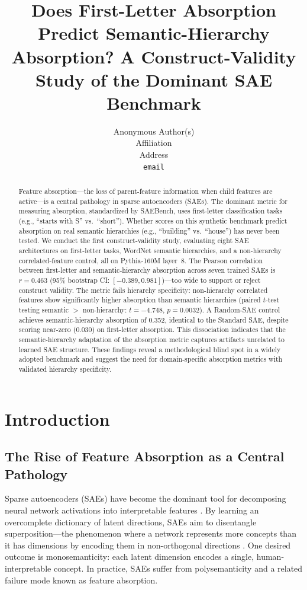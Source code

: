 \documentclass{article}
\title{Does First-Letter Absorption Predict Semantic-Hierarchy Absorption? A Construct-Validity Study of the Dominant SAE Benchmark}
\author{%
  Anonymous Author(s) \\
  Affiliation \\
  Address \\
  \texttt{email} \\
}
\begin{document}
\maketitle

\begin{abstract}
Feature absorption---the loss of parent-feature information when child features are active---is a central pathology in sparse autoencoders (SAEs). The dominant metric for measuring absorption, standardized by SAEBench, uses first-letter classification tasks (e.g., ``starts with S'' vs.~``short''). Whether scores on this synthetic benchmark predict absorption on real semantic hierarchies (e.g., ``building'' vs.~``house'') has never been tested. We conduct the first construct-validity study, evaluating eight SAE architectures on first-letter tasks, WordNet semantic hierarchies, and a non-hierarchy correlated-feature control, all on Pythia-160M layer~8. The Pearson correlation between first-letter and semantic-hierarchy absorption across seven trained SAEs is $r = 0.463$ (95\% bootstrap CI: $[-0.389, 0.981]$)---too wide to support or reject construct validity. The metric fails hierarchy specificity: non-hierarchy correlated features show significantly higher absorption than semantic hierarchies (paired $t$-test testing semantic $>$ non-hierarchy: $t = -4.748$, $p = 0.0032$). A Random-SAE control achieves semantic-hierarchy absorption of 0.352, identical to the Standard SAE, despite scoring near-zero (0.030) on first-letter absorption. This dissociation indicates that the semantic-hierarchy adaptation of the absorption metric captures artifacts unrelated to learned SAE structure. These findings reveal a methodological blind spot in a widely adopted benchmark and suggest the need for domain-specific absorption metrics with validated hierarchy specificity.
\end{abstract}

\section{Introduction}
\label{sec:intro}

\subsection{The Rise of Feature Absorption as a Central Pathology}

Sparse autoencoders (SAEs) have become the dominant tool for decomposing neural network activations into interpretable features \citep{chanin2024absorption}. By learning an overcomplete dictionary of latent directions, SAEs aim to disentangle superposition---the phenomenon where a network represents more concepts than it has dimensions by encoding them in non-orthogonal directions \citep{cui2025monosemantic}. One desired outcome is monosemanticity: each latent dimension encodes a single, human-interpretable concept. In practice, SAEs suffer from polysemanticity and a related failure mode known as feature absorption.
\end{document}
